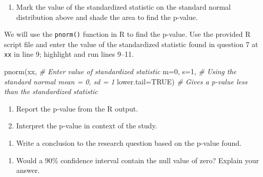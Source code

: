 \documentclass[
]{report}
\newenvironment{Shaded}{\begin{snugshade}}{\end{snugshade}}
\newcommand{\AttributeTok}[1]{\textcolor[rgb]{0.77,0.63,0.00}{#1}}
\newcommand{\CommentTok}[1]{\textcolor[rgb]{0.56,0.35,0.01}{\textit{#1}}}
\newcommand{\ConstantTok}[1]{\textcolor[rgb]{0.00,0.00,0.00}{#1}}
\newcommand{\DecValTok}[1]{\textcolor[rgb]{0.00,0.00,0.81}{#1}}
\newcommand{\FunctionTok}[1]{\textcolor[rgb]{0.00,0.00,0.00}{#1}}
\newcommand{\NormalTok}[1]{#1}
\providecommand{\tightlist}{%
  \setlength{\itemsep}{0pt}\setlength{\parskip}{0pt}}
\begin{document}
\begin{enumerate}
\def\labelenumi{\arabic{enumi}.}
\setcounter{enumi}{7}
\tightlist
\item
  Mark the value of the standardized statistic on the standard normal distribution above and shade the area to find the p-value.
\end{enumerate}

\vspace{0.1in}
\newpage

We will use the \texttt{pnorm()} function in R to find the p-value. Use the provided R script file and enter the value of the standardized statistic found in question 7 at \texttt{xx} in line 9; highlight and run lines 9--11.

\begin{Shaded}
\begin{Highlighting}[]
\FunctionTok{pnorm}\NormalTok{(xx, }\CommentTok{\# Enter value of standardized statistic}
      \AttributeTok{m=}\DecValTok{0}\NormalTok{, }\AttributeTok{s=}\DecValTok{1}\NormalTok{, }\CommentTok{\# Using the standard normal mean = 0, sd = 1}
      \AttributeTok{lower.tail=}\ConstantTok{TRUE}\NormalTok{) }\CommentTok{\# Gives a p{-}value less than the standardized statistic}
\end{Highlighting}
\end{Shaded}

\begin{enumerate}
\def\labelenumi{\arabic{enumi}.}
\setcounter{enumi}{8}
\item
  Report the p-value from the R output.
  \vspace{0.2in}
\item
  Interpret the p-value in context of the study.
\end{enumerate}

\vspace{1in}

\begin{enumerate}
\def\labelenumi{\arabic{enumi}.}
\setcounter{enumi}{10}
\tightlist
\item
  Write a conclusion to the research question based on the p-value found.
\end{enumerate}

\vspace{0.8in}

\begin{enumerate}
\def\labelenumi{\arabic{enumi}.}
\setcounter{enumi}{11}
\tightlist
\item
  Would a 90\% confidence interval contain the null value of zero? Explain your answer.
\end{enumerate}
\end{document}
